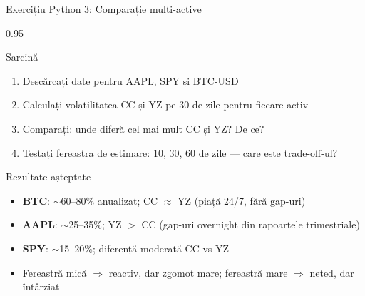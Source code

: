 \documentclass[9pt, aspectratio=169, t]{beamer}
\begin{document}
\begin{frame}[shrink=10]{Exercițiu Python 3: Comparație multi-active}
\begin{cminipage}{0.95\textwidth}
    \begin{block}{Sarcină}
    \begin{enumerate}\setlength{\itemsep}{0pt}
        \item Descărcați date pentru AAPL, SPY și BTC-USD
        \item Calculați volatilitatea CC și YZ pe 30 de zile pentru fiecare activ
        \item Comparați: unde diferă cel mai mult CC și YZ? De ce?
        \item Testați fereastra de estimare: 10, 30, 60 de zile --- care este trade-off-ul?
    \end{enumerate}
    \end{block}

    \vspace{0.2cm}
    \begin{exampleblock}{Rezultate așteptate}
    \begin{itemize}\setlength{\itemsep}{0pt}
        \item \textbf{BTC}: $\sim$60--80\% anualizat; CC $\approx$ YZ (piață 24/7, fără gap-uri)
        \item \textbf{AAPL}: $\sim$25--35\%; YZ $>$ CC (gap-uri overnight din rapoartele trimestriale)
        \item \textbf{SPY}: $\sim$15--20\%; diferență moderată CC vs YZ
        \item Fereastră mică $\Rightarrow$ reactiv, dar zgomot mare; fereastră mare $\Rightarrow$ neted, dar întârziat
    \end{itemize}
    \end{exampleblock}

\end{cminipage}
\end{frame}
\end{document}
